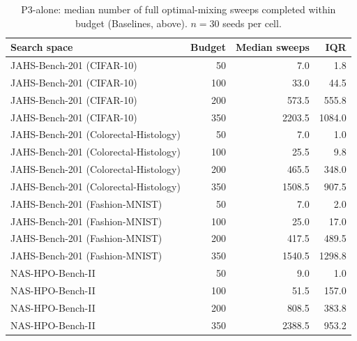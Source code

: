\begin{table}[t]
    \centering
    \footnotesize
    \caption{P3-alone: median number of full optimal-mixing sweeps completed within budget (Baselines,
    above). $n=30$ seeds per cell.}
    \label{tab:p3-alone-sweeps}
    \begin{tabular}{@{}lrrr@{}}
        \toprule
        \textbf{Search space} & \textbf{Budget} & \textbf{Median sweeps} & \textbf{IQR} \\
        \midrule
        JAHS-Bench-201 (CIFAR-10) & 50 & 7.0 & 1.8 \\
        JAHS-Bench-201 (CIFAR-10) & 100 & 33.0 & 44.5 \\
        JAHS-Bench-201 (CIFAR-10) & 200 & 573.5 & 555.8 \\
        JAHS-Bench-201 (CIFAR-10) & 350 & 2203.5 & 1084.0 \\
        JAHS-Bench-201 (Colorectal-Histology) & 50 & 7.0 & 1.0 \\
        JAHS-Bench-201 (Colorectal-Histology) & 100 & 25.5 & 9.8 \\
        JAHS-Bench-201 (Colorectal-Histology) & 200 & 465.5 & 348.0 \\
        JAHS-Bench-201 (Colorectal-Histology) & 350 & 1508.5 & 907.5 \\
        JAHS-Bench-201 (Fashion-MNIST) & 50 & 7.0 & 2.0 \\
        JAHS-Bench-201 (Fashion-MNIST) & 100 & 25.0 & 17.0 \\
        JAHS-Bench-201 (Fashion-MNIST) & 200 & 417.5 & 489.5 \\
        JAHS-Bench-201 (Fashion-MNIST) & 350 & 1540.5 & 1298.8 \\
        NAS-HPO-Bench-II & 50 & 9.0 & 1.0 \\
        NAS-HPO-Bench-II & 100 & 51.5 & 157.0 \\
        NAS-HPO-Bench-II & 200 & 808.5 & 383.8 \\
        NAS-HPO-Bench-II & 350 & 2388.5 & 953.2 \\
        \bottomrule
    \end{tabular}
\end{table}

